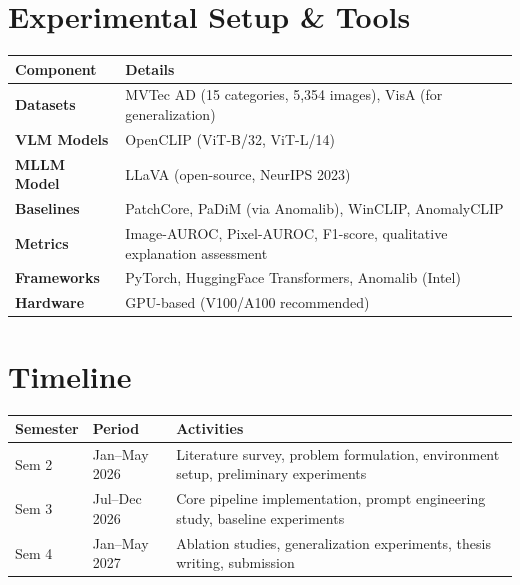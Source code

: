 \documentclass[12pt, a4paper]{article}
\begin{document}

\section{Experimental Setup \& Tools}

\begin{tabularx}{\textwidth}{@{}lX@{}}
\toprule
\textbf{Component} & \textbf{Details} \\
\midrule
\textbf{Datasets} & MVTec AD (15 categories, 5,354 images), VisA (for generalization) \\
\textbf{VLM Models} & OpenCLIP (ViT-B/32, ViT-L/14) \\
\textbf{MLLM Model} & LLaVA (open-source, NeurIPS 2023) \\
\textbf{Baselines} & PatchCore, PaDiM (via Anomalib), WinCLIP, AnomalyCLIP \\
\textbf{Metrics} & Image-AUROC, Pixel-AUROC, F1-score, qualitative explanation assessment \\
\textbf{Frameworks} & PyTorch, HuggingFace Transformers, Anomalib (Intel) \\
\textbf{Hardware} & GPU-based (V100/A100 recommended) \\
\bottomrule
\end{tabularx}

\vspace{0.5cm}

\section{Timeline}

\begin{tabularx}{\textwidth}{@{}p{2cm}p{2.5cm}X@{}}
\toprule
\textbf{Semester} & \textbf{Period} & \textbf{Activities} \\
\midrule
Sem 2 & Jan--May 2026 & Literature survey, problem formulation, environment setup, preliminary experiments \\
Sem 3 & Jul--Dec 2026 & Core pipeline implementation, prompt engineering study, baseline experiments \\
Sem 4 & Jan--May 2027 & Ablation studies, generalization experiments, thesis writing, submission \\
\bottomrule
\end{tabularx}
\end{document}
